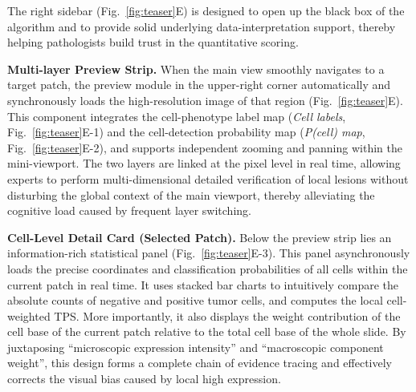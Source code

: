 \documentclass[journal]{vgtc}                     %
\begin{document}
The right sidebar (Fig.~\ref{fig:teaser}E) is designed to open up the black box of the algorithm and to provide solid underlying data-interpretation support, thereby helping pathologists build trust in the quantitative scoring.

\textbf{Multi-layer Preview Strip.} When the main view smoothly navigates to a target patch, the preview module in the upper-right corner automatically and synchronously loads the high-resolution image of that region (Fig.~\ref{fig:teaser}E). This component integrates the cell-phenotype label map (\textit{Cell labels}, Fig.~\ref{fig:teaser}E-1) and the cell-detection probability map (\textit{P(cell) map}, Fig.~\ref{fig:teaser}E-2), and supports independent zooming and panning within the mini-viewport. The two layers are linked at the pixel level in real time, allowing experts to perform multi-dimensional detailed verification of local lesions without disturbing the global context of the main viewport, thereby alleviating the cognitive load caused by frequent layer switching.

\textbf{Cell-Level Detail Card (Selected Patch).} Below the preview strip lies an information-rich statistical panel (Fig.~\ref{fig:teaser}E-3). This panel asynchronously loads the precise coordinates and classification probabilities of all cells within the current patch in real time. It uses stacked bar charts to intuitively compare the absolute counts of negative and positive tumor cells, and computes the local cell-weighted TPS. More importantly, it also displays the weight contribution of the cell base of the current patch relative to the total cell base of the whole slide. By juxtaposing ``microscopic expression intensity'' and ``macroscopic component weight'', this design forms a complete chain of evidence tracing and effectively corrects the visual bias caused by local high expression.
\end{document}
